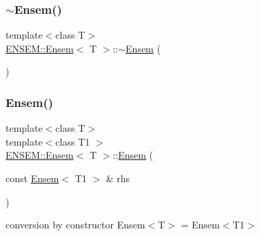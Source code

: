 \mbox{\label{classENSEM_1_1Ensem_a01e4e19b101048ad2ffcf886017592c9}} 
\subsubsection{\texorpdfstring{$\sim$Ensem()}{~Ensem()}\hspace{0.1cm}{\footnotesize\ttfamily [2/3]}}
{\footnotesize\ttfamily template$<$class T$>$ \\
\mbox{\hyperlink{classENSEM_1_1Ensem}{E\+N\+S\+E\+M\+::\+Ensem}}$<$ T $>$\+::$\sim$\mbox{\hyperlink{classENSEM_1_1Ensem}{Ensem}} (\begin{DoxyParamCaption}{ }\end{DoxyParamCaption})\hspace{0.3cm}{\ttfamily [inline]}}

\mbox{\label{classENSEM_1_1Ensem_ab0e04ebf09af997fb7f1477cdc48145b}} 
\subsubsection{\texorpdfstring{Ensem()}{Ensem()}\hspace{0.1cm}{\footnotesize\ttfamily [5/9]}}
{\footnotesize\ttfamily template$<$class T$>$ \\
template$<$class T1 $>$ \\
\mbox{\hyperlink{classENSEM_1_1Ensem}{E\+N\+S\+E\+M\+::\+Ensem}}$<$ T $>$\+::\mbox{\hyperlink{classENSEM_1_1Ensem}{Ensem}} (\begin{DoxyParamCaption}\item[{const \mbox{\hyperlink{classENSEM_1_1Ensem}{Ensem}}$<$ T1 $>$ \&}]{rhs }\end{DoxyParamCaption})\hspace{0.3cm}{\ttfamily [inline]}}



conversion by constructor Ensem$<$\+T$>$ = Ensem$<$\+T1$>$ 

